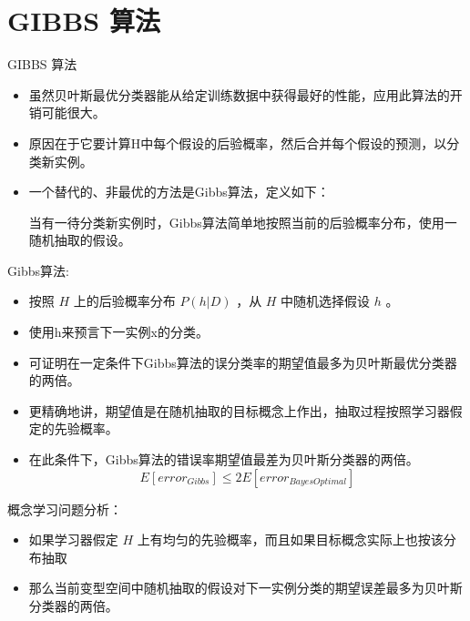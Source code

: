 \documentclass[presentation]{beamer}
\begin{document}
\section{GIBBS 算法}
\label{sec:orgf6823b1}
\begin{frame}[label={sec:orgb8b9789}]{GIBBS 算法}
\begin{itemize}
\item 虽然贝叶斯最优分类器能从给定训练数据中获得最好的性能，应用此算法的开销可能很大。
\item 原因在于它要计算H中每个假设的后验概率，然后合并每个假设的预测，以分类新实例。
\item 一个替代的、非最优的方法是Gibbs算法，定义如下：

当有一待分类新实例时，Gibbs算法简单地按照当前的后验概率分布，使用一随机抽取的假设。
\end{itemize}
\end{frame}

\begin{frame}[label={sec:orga04f246}]{Gibbs算法:}
\begin{itemize}
\item 按照 \(H\) 上的后验概率分布 \(P(h|D)\) ，从 \(H\) 中随机选择假设 \(h\) 。
\item 使用h来预言下一实例x的分类。

\item 可证明在一定条件下Gibbs算法的误分类率的期望值最多为贝叶斯最优分类器的两倍。
\item 更精确地讲，期望值是在随机抽取的目标概念上作出，抽取过程按照学习器假定的先验概率。
\item 在此条件下，Gibbs算法的错误率期望值最差为贝叶斯分类器的两倍。
\[ E[error_{Gibbs}] \leq 2 E[error_{Bayes Optimal}] \]
\end{itemize}
\end{frame}

\begin{frame}[label={sec:org78e4ce6}]{概念学习问题分析：}
\begin{itemize}
\item 如果学习器假定 \(H\) 上有均匀的先验概率，而且如果目标概念实际上也按该分布抽取
\item 那么当前变型空间中随机抽取的假设对下一实例分类的期望误差最多为贝叶斯分类器的两倍。
\end{itemize}
\end{frame}
\end{document}
